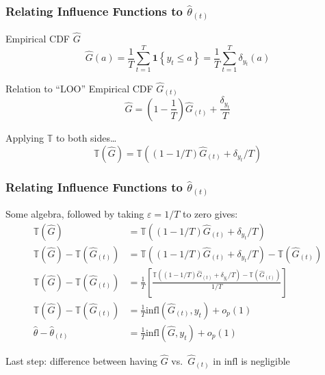 \begin{frame}
  \frametitle{Relating Influence Functions to $\widehat{\theta}_{(t)}$}

  \begin{block}{Empirical CDF $\widehat{G}$}
    \vspace{-1em}
    \[\widehat{G}(a) = \displaystyle\frac{1}{T}\sum_{t=1}^T \mathbf{1}\left\{ y_t \leq a \right\} = \displaystyle\frac{1}{T} \sum_{t=1}^T \delta_{y_t}(a)\]
  \end{block}

  \vspace{-1em}

  \begin{block}{Relation to ``LOO'' Empirical CDF $\widehat{G}_{(t)}$}
    \vspace{-1em}
  \[\displaystyle \widehat{G} = \left( 1 - \frac{1}{T} \right) \widehat{G}_{(t)} + \frac{\delta_{y_t}}{T}\]
  \end{block}

  \vspace{-1em}

  \begin{block}{Applying $\mathbb{T}$ to both sides\dots}
    \vspace{-1em}
   \[ 
      \mathbb{T}(\widehat{G}) = \mathbb{T}\left( (1 - 1/T) \widehat{G}_{(t)} + \delta_{y_t}/T\right)
    \]
  \end{block}
\end{frame}
\begin{frame}
  \frametitle{Relating Influence Functions to $\widehat{\theta}_{(t)}$}
  Some algebra, followed by taking $\varepsilon = 1/T$ to zero gives:
  \begin{align*}
      \mathbb{T}(\widehat{G}) &= \mathbb{T}\left( (1 - 1/T) \widehat{G}_{(t)} + \delta_{y_t}/T\right)\\
      \mathbb{T}(\widehat{G}) - \mathbb{T}(\widehat{G}_{(t)}) &= \mathbb{T}\left( (1 - 1/T) \widehat{G}_{(t)} + \delta_{y_t}/T\right) - \mathbb{T}(\widehat{G}_{(t)})\\
      \mathbb{T}(\widehat{G}) - \mathbb{T}(\widehat{G}_{(t)}) &= \frac{1}{T}\left[ \frac{\mathbb{T}\left( (1 - 1/T) \widehat{G}_{(t)} + \delta_{y_t}/T\right) - \mathbb{T}(\widehat{G}_{(t)})}{1/T}\right]\\
      \mathbb{T}(\widehat{G}) - \mathbb{T}(\widehat{G}_{(t)}) &= \frac{1}{T} \mbox{infl}\left(\widehat{G}_{(t)}, y_t\right) + o_p(1)\\
      \widehat{\theta} - \widehat{\theta}_{(t)} &= \frac{1}{T} \mbox{infl}\left( \widehat{G},y_t \right) + o_p(1)
    \end{align*}

    \alert{Last step: difference between having $\widehat{G}$ vs.\ $\widehat{G}_{(t)}$ in $\mbox{infl}$ is negligible}

\end{frame}
